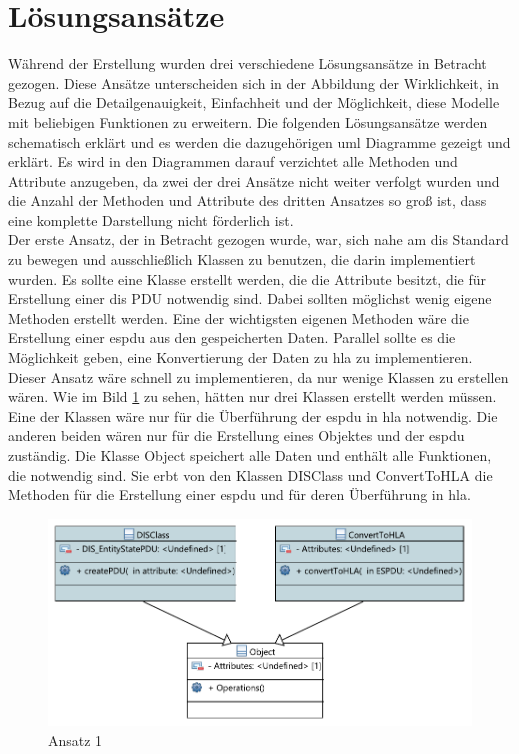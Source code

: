\section{Lösungsansätze}\label{lös}
Während der Erstellung wurden drei verschiedene Lösungsansätze in Betracht gezogen.
Diese Ansätze unterscheiden sich in der Abbildung der Wirklichkeit, in Bezug auf die Detailgenauigkeit, Einfachheit und der Möglichkeit, diese Modelle mit beliebigen Funktionen zu erweitern. Die folgenden Lösungsansätze werden schematisch erklärt und es werden die dazugehörigen \ac{uml} Diagramme gezeigt und erklärt. Es wird in den Diagrammen darauf verzichtet alle Methoden und Attribute anzugeben, da zwei der drei Ansätze nicht weiter verfolgt wurden und die Anzahl der Methoden und Attribute des dritten Ansatzes so groß ist, dass eine komplette Darstellung nicht förderlich ist.\\
Der erste Ansatz, der in Betracht gezogen wurde, war, sich nahe am \ac{dis} Standard zu bewegen und ausschließlich Klassen zu benutzen, die darin implementiert wurden. Es sollte eine Klasse erstellt werden, die die Attribute besitzt, die für Erstellung einer \ac{dis} PDU notwendig sind. Dabei sollten möglichst wenig eigene Methoden erstellt werden. Eine der wichtigsten eigenen Methoden wäre die Erstellung einer \ac{espdu} aus den gespeicherten Daten. Parallel sollte es die Möglichkeit geben, eine Konvertierung der Daten zu \ac{hla} zu implementieren. Dieser Ansatz wäre schnell zu implementieren, da nur wenige Klassen zu erstellen wären.  Wie im Bild \ref{ansatz1} zu sehen, hätten nur drei Klassen erstellt werden müssen. Eine der Klassen wäre nur für die Überführung der \ac{espdu} in \ac{hla} notwendig. Die anderen beiden wären nur für die Erstellung eines Objektes und der \ac{espdu} zuständig. 
Die Klasse \glqq Object\grqq{} speichert alle Daten und enthält alle Funktionen, die notwendig sind. Sie erbt von den Klassen  \glqq DISClass\grqq{} und  \glqq ConvertToHLA\grqq{} die Methoden für die Erstellung einer \ac{espdu} und für deren Überführung in \ac{hla}. 
 \begin{figure}[H]
	\centering
	\includegraphics[scale=0.9]{bilder/pdfvorlagen/ansatz2}
	\caption[Ansatz 1]{Ansatz 1}
	\label{ansatz1}
\end{figure}

